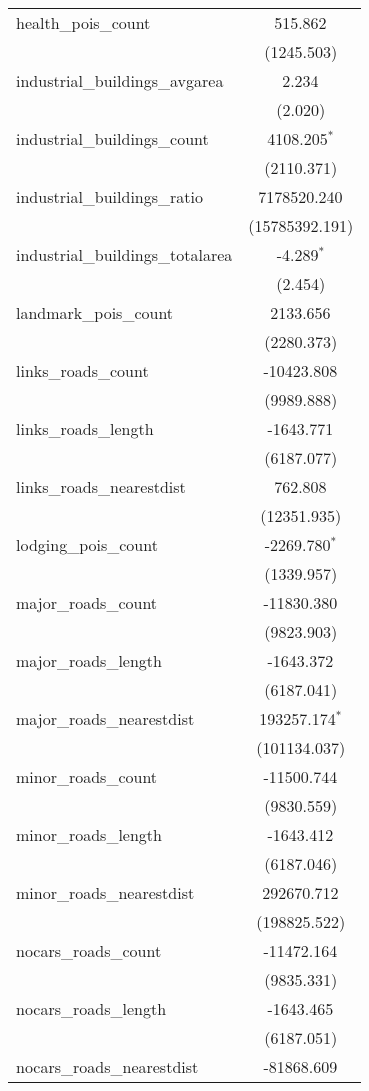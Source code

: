 \begin{table}[!htbp]
\begin{tabular}{@{\extracolsep{5pt}}lc}
 health_pois_count & 515.862$^{}$ \\
  & (1245.503) \\
 industrial_buildings_avgarea & 2.234$^{}$ \\
  & (2.020) \\
 industrial_buildings_count & 4108.205$^{*}$ \\
  & (2110.371) \\
 industrial_buildings_ratio & 7178520.240$^{}$ \\
  & (15785392.191) \\
 industrial_buildings_totalarea & -4.289$^{*}$ \\
  & (2.454) \\
 landmark_pois_count & 2133.656$^{}$ \\
  & (2280.373) \\
 links_roads_count & -10423.808$^{}$ \\
  & (9989.888) \\
 links_roads_length & -1643.771$^{}$ \\
  & (6187.077) \\
 links_roads_nearestdist & 762.808$^{}$ \\
  & (12351.935) \\
 lodging_pois_count & -2269.780$^{*}$ \\
  & (1339.957) \\
 major_roads_count & -11830.380$^{}$ \\
  & (9823.903) \\
 major_roads_length & -1643.372$^{}$ \\
  & (6187.041) \\
 major_roads_nearestdist & 193257.174$^{*}$ \\
  & (101134.037) \\
 minor_roads_count & -11500.744$^{}$ \\
  & (9830.559) \\
 minor_roads_length & -1643.412$^{}$ \\
  & (6187.046) \\
 minor_roads_nearestdist & 292670.712$^{}$ \\
  & (198825.522) \\
 nocars_roads_count & -11472.164$^{}$ \\
  & (9835.331) \\
 nocars_roads_length & -1643.465$^{}$ \\
  & (6187.051) \\
 nocars_roads_nearestdist & -81868.609$^{}$ \\

\end{tabular}
\end{table}
